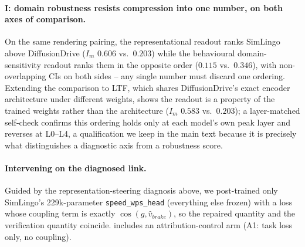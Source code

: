\paragraph{I: domain robustness resists compression into one number, on both axes
of comparison.} On the same rendering pairing, the representational readout ranks
SimLingo above DiffusionDrive ($I_m$ $0.606$ vs.\ $0.203$) while the behavioural
domain-sensitivity readout ranks them in the opposite order ($0.115$ vs.\ $0.346$), with
non-overlapping CIs on both sides -- any single number must discard one ordering.
Extending the comparison to LTF, which shares DiffusionDrive's exact encoder
architecture under different weights, shows the readout is a property of the trained
weights rather than the architecture ($I_m$ $0.583$ vs.\ $0.203$); a layer-matched
self-check confirms this ordering holds only at each model's own peak layer and reverses
at L0--L4, a qualification we keep in the main text because it is precisely what
distinguishes a diagnostic axis from a robustness score.

\paragraph{Intervening on the diagnosed link.} Guided by the representation-steering
diagnosis above, we post-trained only SimLingo's 229k-parameter
\texttt{speed\_wps\_head} (everything else frozen) with a loss whose coupling term is
exactly $\cos(g,\hat v_{brake})$, so the repaired quantity and the verification quantity
coincide.
 includes an attribution-control arm (A1: task loss only, no coupling).

\begin{table}[t]
\centering
\caption{Pilot post-train on SimLingo (229k parameters), held-out scenes.}
\label{tab:pilot}
\scriptsize
{}
\end{table}

